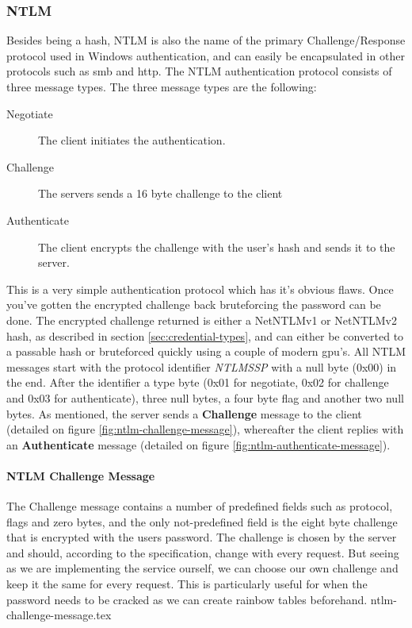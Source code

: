 \documentclass{article}
\begin{document}
\subsubsection{NTLM}
Besides being a hash, NTLM is also the name of the primary Challenge/Response protocol used in Windows authentication, and can easily be encapsulated in other protocols such as \gls{smb} and \gls{http}. The NTLM authentication protocol consists of three message types\cite{url:microsoft:ntlm-message-syntax}. The three message types are the following:

\begin{description}
    \item[Negotiate] The client initiates the authentication.
    \item[Challenge] The servers sends a 16 byte challenge to the client
    \item[Authenticate] The client encrypts the challenge with the user's hash and sends it to the server.
\end{description}

This is a very simple authentication protocol which has it's obvious flaws. Once you've gotten the encrypted challenge back bruteforcing the password can be done. The encrypted challenge returned is either a NetNTLMv1 or NetNTLMv2 hash, as described in section \ref{sec:credential-types}, and can either be converted to a passable hash or bruteforced quickly using a couple of modern \gls{gpu}'s. All NTLM messages start with the protocol identifier \emph{NTLMSSP} with  a null byte (0x00) in the end\cite{url:http-ntlm-authentication}. After the identifier a type byte (0x01 for negotiate, 0x02 for challenge and 0x03 for authenticate), three null bytes, a four byte flag and another two null bytes. As mentioned, the server sends a \textbf{Challenge} message to the client (detailed on figure \ref{fig:ntlm-challenge-message}), whereafter the client replies with an \textbf{Authenticate} message (detailed on figure \ref{fig:ntlm-authenticate-message}).

\paragraph{NTLM Challenge Message}
The Challenge message contains a number of predefined fields such as protocol, flags and zero bytes, and the only not-predefined field is the eight byte challenge that is encrypted with the users password. The challenge is chosen by the server and should, according to the specification, change with every request. But seeing as we are implementing the service ourself, we can choose our own challenge and keep it the same for every request. This is particularly useful for when the password needs to be cracked as we can create rainbow tables beforehand.
{ntlm-challenge-message.tex}
\end{document}
